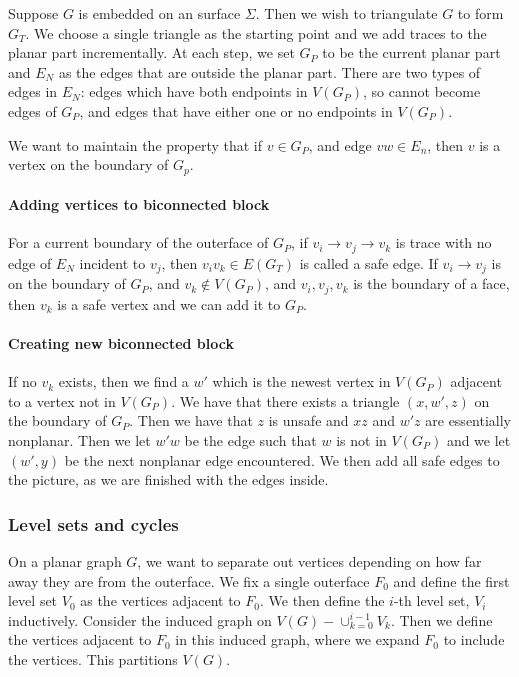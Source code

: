 \documentclass[]{report}
\theoremstyle{definition}
\numberwithin{theorem}{section}
\numberwithin{equation}{section}
\begin{document}
Suppose $G$ is embedded on an surface $\Sigma$. Then we wish to triangulate $G$ to form $G_T$. We choose a single triangle as the starting point and we add traces to the planar part incrementally. At each step, we set $G_P$ to be the current planar part and $E_N$ as the edges that are outside the planar part. There are two types of edges in $E_N$: edges which have both endpoints in $V(G_P)$, so cannot become edges of $G_P$, and edges that have either one or no endpoints in $V(G_P)$. 

We want to maintain the property that if $v \in G_P$, and edge $vw \in E_n$, then $v$ is a vertex on the boundary of $G_p$. 
\paragraph{Adding vertices to biconnected block}
For a current boundary of the outerface of $G_P$, if $v_i \rightarrow v_j \rightarrow v_k$ is trace with no edge of $E_N$ incident to $v_j$, then $v_iv_k \in E(G_T)$ is called a safe edge. If $v_i \rightarrow v_j$ is on the boundary of $G_P$, and $v_k \notin V(G_P)$, and $v_i,v_j,v_k$ is the boundary of a face, then $v_k$ is a safe vertex and we can add it to $G_P$. 
\paragraph{Creating new biconnected block}
If no $v_k$ exists, then we find a $w'$ which is the newest vertex in $V(G_P)$ adjacent to a vertex not in $V(G_P)$. We have that there exists a triangle $(x, w', z)$ on the boundary of $G_P$. Then we have that $z$ is unsafe and $xz$ and $w'z$ are essentially nonplanar. Then we let $w'w$ be the edge such that $w$ is not in $V(G_P)$ and we let $(w', y)$ be the next nonplanar edge encountered. 
We then add all safe edges to the picture, as we are finished with the edges inside.

\subsubsection{Level sets and cycles}
On a planar graph $G$, we want to separate out vertices depending on how far away they are from the outerface. We fix a single outerface $F_0$ and define the first level set $V_0$ as the vertices adjacent to $F_0$. We then define the $i$-th level set, $V_i$ inductively. Consider the induced graph on $V(G) - \cup_{k = 0}^{i-1} V_k$. Then we define the vertices adjacent to $F_0$ in this induced graph, where we expand $F_0$ to include the vertices. This partitions $V(G)$.
\end{document}
